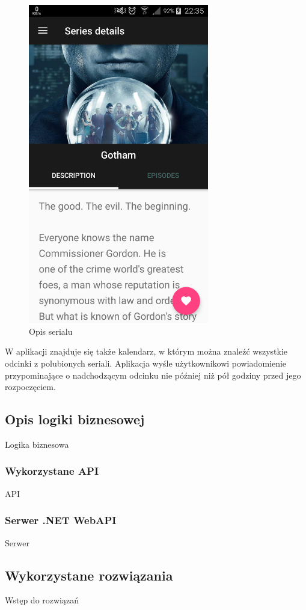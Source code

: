 \documentclass[10pt,a4paper]{article}
\begin{document}
\begin{figure}[H]
	\centering
	\includegraphics[height=14cm]{Resources/Images/details.png}
	\caption{Opis serialu}
\end{figure}
\noindent
W aplikacji znajduje się także kalendarz, w którym można znaleźć wszystkie odcinki z polubionych seriali. Aplikacja wyśle użytkownikowi powiadomienie przypominające o nadchodzącym odcinku nie później niż pół godziny przed jego rozpoczęciem.

\newpage
\subsection{Opis logiki biznesowej}
Logika biznesowa

\subsubsection{Wykorzystane API}
API

\subsubsection{Serwer .NET WebAPI}
Serwer

\subsection{Wykorzystane rozwiązania}
Wstęp do rozwiązań
\end{document}
